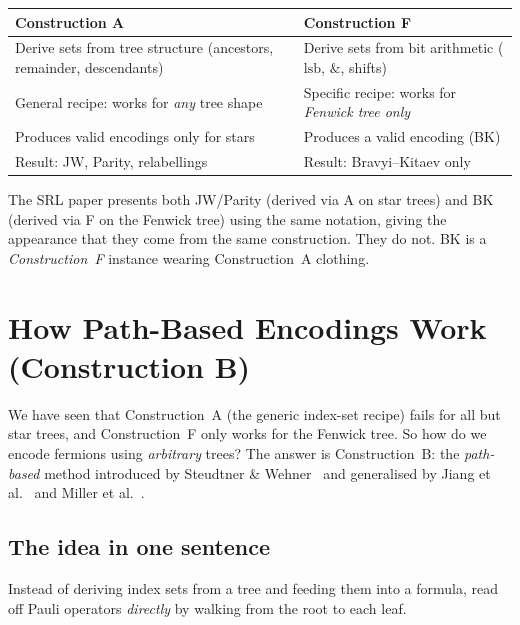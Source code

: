 \documentclass[11pt,a4paper]{article}
\theoremstyle{definition}
\begin{document}
\begin{center}
\begin{tabular}{@{}p{5.5cm}p{5.5cm}@{}}
\toprule
\textbf{Construction A} & \textbf{Construction F} \\
\midrule
Derive sets from tree structure\newline
(ancestors, remainder, descendants) &
Derive sets from bit arithmetic\newline
($\mathrm{lsb}$, $\mathbin{\&}$, shifts) \\
\addlinespace
General recipe: works for \emph{any} tree shape &
Specific recipe: works for \emph{Fenwick tree only} \\
\addlinespace
Produces valid encodings only for stars &
Produces a valid encoding (BK) \\
\addlinespace
Result: JW, Parity, relabellings &
Result: Bravyi--Kitaev only \\
\bottomrule
\end{tabular}
\end{center}

The SRL paper presents both JW/Parity (derived via A on star trees)
and BK (derived via F on the Fenwick tree) using the same notation,
giving the appearance that they come from the same construction.  They
do not.  BK is a \emph{Construction~F} instance wearing
Construction~A clothing.

\section{How Path-Based Encodings Work (Construction B)}
\label{sec:construction-b}

We have seen that Construction~A (the generic index-set recipe) fails
for all but star trees, and Construction~F only works for the Fenwick
tree.  So how do we encode fermions using \emph{arbitrary} trees?  The
answer is Construction~B: the \emph{path-based}
method introduced by Steudtner \& Wehner~\cite{steudtner2018} and
generalised by Jiang et al.~\cite{jiang2020} and Miller et
al.~\cite{miller2023bonsai}.

\subsection{The idea in one sentence}

Instead of deriving index sets from a tree and feeding them into a
formula, read off Pauli operators \emph{directly} by walking from the
root to each leaf.
\end{document}
